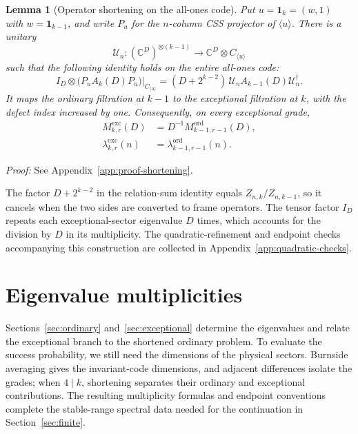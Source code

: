 \documentclass[journal,twocolumn]{IEEEtran}
\newtheorem{lemma}[theorem]{Lemma}
\theoremstyle{definition}
\theoremstyle{plain}
\newcommand{\Ord}{\mathrm{ord}}
\newcommand{\Exc}{\mathrm{exc}}
\newcommand{\one}{\bm 1}
\begin{document}
\begin{lemma}[Operator shortening on the all-ones code]
\label{lemS:shortening}
Put $u=\one_k=(w,1)$ with $w=\one_{k-1}$, and write $P_u$ for the
$n$-column CSS projector of $\langle u\rangle$.  There is a unitary
\begin{equation}
 \mathcal U_n:(\mathbb C^D)^{\otimes(k-1)}
 \longrightarrow\mathbb C^D\otimes C_{\langle u\rangle}
 \label{eqS:shortening-unitary}
\end{equation}
such that the following identity holds on the entire all-ones code:
\begin{equation}
 I_D\otimes\bigl(P_uA_k(D)P_u\bigr)|_{C_{\langle u\rangle}}
 =(D+2^{k-2})\,\mathcal U_nA_{k-1}(D)\mathcal U_n^\dagger.
 \label{eqS:shortening-intertwiner}
\end{equation}
It maps the ordinary filtration at $k-1$ to the exceptional filtration at
$k$, with the defect index increased by one.  Consequently, on every
exceptional grade,
\begin{equation}
 \begin{aligned}
 M^{\Exc}_{k,r}(D)&=D^{-1}M^{\Ord}_{k-1,r-1}(D),\\
 \lambda^{\Exc}_{k,r}(n)&=\lambda^{\Ord}_{k-1,r-1}(n).
 \end{aligned}
 \label{eqS:shortening-spectrum}
\end{equation}
\end{lemma}

\noindent\emph{Proof:} See Appendix~\ref{app:proof-shortening}.\par

The factor $D+2^{k-2}$ in the relation-sum identity equals
$Z_{n,k}/Z_{n,k-1}$, so it cancels when the two sides are converted to
frame operators.  The tensor factor $I_D$ repeats each exceptional-sector
eigenvalue $D$ times, which accounts for the division by $D$ in its
multiplicity.  The quadratic-refinement and endpoint checks accompanying
this construction are collected in Appendix~\ref{app:quadratic-checks}.

\section{Eigenvalue multiplicities}
\label{sec:multiplicity}
Sections~\ref{sec:ordinary} and~\ref{sec:exceptional} determine the
eigenvalues and relate the exceptional branch to the shortened ordinary
problem.  To evaluate the success probability, we still need the
dimensions of the physical sectors.  Burnside averaging gives the
invariant-code dimensions, and adjacent differences isolate the grades;
when $4\mid k$, shortening separates their ordinary and exceptional
contributions.  The resulting multiplicity formulas and endpoint
conventions complete the stable-range spectral data needed for the
continuation in Section~\ref{sec:finite}.
\end{document}

